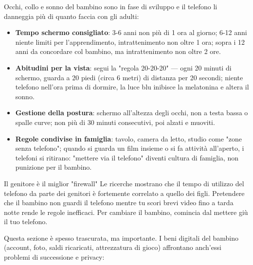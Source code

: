
Occhi, collo e sonno del bambino sono in fase di sviluppo e il telefono li danneggia più di quanto faccia con gli adulti:

\begin{itemize}
  \item \textbf{Tempo schermo consigliato}: 3-6 anni non più di 1 ora al giorno; 6-12 anni niente limiti per l'apprendimento, intrattenimento non oltre 1 ora; sopra i 12 anni da concordare col bambino, ma intrattenimento non oltre 2 ore.
  \item \textbf{Abitudini per la vista}: segui la "regola 20-20-20" — ogni 20 minuti di schermo, guarda a 20 piedi (circa 6 metri) di distanza per 20 secondi; niente telefono nell'ora prima di dormire, la luce blu inibisce la melatonina e altera il sonno.
  \item \textbf{Gestione della postura}: schermo all'altezza degli occhi, non a testa bassa o spalle curve; non più di 30 minuti consecutivi, poi alzati e muoviti.
  \item \textbf{Regole condivise in famiglia}: tavolo, camera da letto, studio come "zone senza telefono"; quando si guarda un film insieme o si fa attività all'aperto, i telefoni si ritirano: "mettere via il telefono" diventi cultura di famiglia, non punizione per il bambino.
\end{itemize}

\begin{tcbinfo}{Il genitore è il miglior "firewall"}
Le ricerche mostrano che il tempo di utilizzo del telefono da parte dei genitori è fortemente correlato a quello dei figli. Pretendere che il bambino non guardi il telefono mentre tu scori brevi video fino a tarda notte rende le regole inefficaci. Per cambiare il bambino, comincia dal mettere giù il tuo telefono.

\end{tcbinfo}


Questa sezione è spesso trascurata, ma importante. I beni digitali del bambino (account, foto, saldi ricaricati, attrezzatura di gioco) affrontano anch'essi problemi di successione e privacy:

